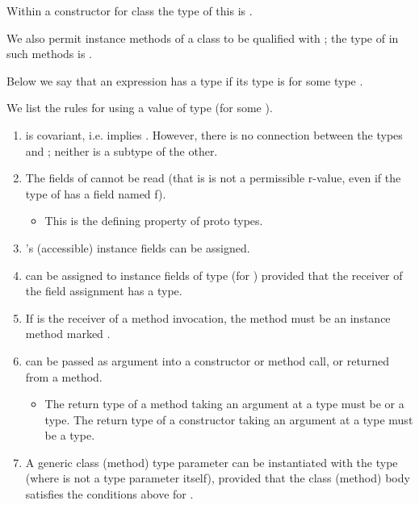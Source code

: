   Within a constructor for class  the type of this is . 


  We also permit instance methods of a class  to be qualified with
  ; the type of  in such methods is .


Below we say that an expression has a  type if its type is  for some type . 


  We list the rules for using a value  of type  (for some ). 

\begin{enumerate}
\item {} is covariant, i.e.  implies . However, there is no connection between the types  and ; neither is a subtype of the other. 
\item  The fields of  cannot be read (that is  is not a permissible r-value, even if the type of  has a field named f). \begin{itemize}
\item  This is the defining property of proto types.
\end{itemize}
 
\item {}'s (accessible) instance fields can be assigned. 
\item {} can be assigned to instance fields of type  (for ) provided that the receiver of the field assignment has a  type. 
\item  If  is the receiver of a method invocation, the method must be an instance method marked . 
\item {} can be passed as argument into a constructor or method call, or returned from a method. \begin{itemize}
\item  The return type of a method taking an argument at a  type must be  or a  type. The return type of a constructor taking an argument at a  type must be a  type.
\end{itemize}
 
\item A generic class (method) type parameter  can be
  instantiated with the type  (where  is not a type
  parameter itself), provided that the class (method) body satisfies
  the conditions above for .
\end{enumerate}

